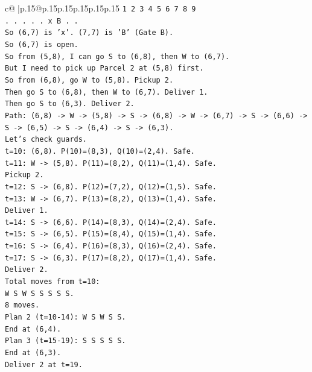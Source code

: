 \documentclass{article}
\begin{document}
{\begin{supertabular}{c@{$\;$}|p{.15\linewidth}@{}p{.15\linewidth}p{.15\linewidth}p{.15\linewidth}p{.15\linewidth}p{.15\linewidth}}
{{{\texttt{1 2 3 4 5 6 7 8 9} \\
\texttt{. . . . . x B . .} \\
\texttt{So (6,7) is 'x'. (7,7) is 'B' (Gate B).} \\
\texttt{So (6,7) is open.} \\
\texttt{So from (5,8), I can go S to (6,8), then W to (6,7).} \\
\texttt{But I need to pick up Parcel 2 at (5,8) first.} \\
\texttt{So from (6,8), go W to (5,8). Pickup 2.} \\
\texttt{Then go S to (6,8), then W to (6,7). Deliver 1.} \\
\texttt{Then go S to (6,3). Deliver 2.} \\
\texttt{Path: (6,8) {-}> W {-}> (5,8) {-}> S {-}> (6,8) {-}> W {-}> (6,7) {-}> S {-}> (6,6) {-}> S {-}> (6,5) {-}> S {-}> (6,4) {-}> S {-}> (6,3).} \\
\texttt{Let's check guards.} \\
\texttt{t=10: (6,8). P(10)=(8,3), Q(10)=(2,4). Safe.} \\
\texttt{t=11: W {-}> (5,8). P(11)=(8,2), Q(11)=(1,4). Safe.} \\
\texttt{Pickup 2.} \\
\texttt{t=12: S {-}> (6,8). P(12)=(7,2), Q(12)=(1,5). Safe.} \\
\texttt{t=13: W {-}> (6,7). P(13)=(8,2), Q(13)=(1,4). Safe.} \\
\texttt{Deliver 1.} \\
\texttt{t=14: S {-}> (6,6). P(14)=(8,3), Q(14)=(2,4). Safe.} \\
\texttt{t=15: S {-}> (6,5). P(15)=(8,4), Q(15)=(1,4). Safe.} \\
\texttt{t=16: S {-}> (6,4). P(16)=(8,3), Q(16)=(2,4). Safe.} \\
\texttt{t=17: S {-}> (6,3). P(17)=(8,2), Q(17)=(1,4). Safe.} \\
\texttt{Deliver 2.} \\
\texttt{Total moves from t=10:} \\
\texttt{W S W S S S S S.} \\
\texttt{8 moves.} \\
\texttt{Plan 2 (t=10{-}14): W S W S S.} \\
\texttt{End at (6,4).} \\
\texttt{Plan 3 (t=15{-}19): S S S S S.} \\
\texttt{End at (6,3).} \\
\texttt{Deliver 2 at t=19.} \\
}}}
\end{supertabular}}
\end{document}
